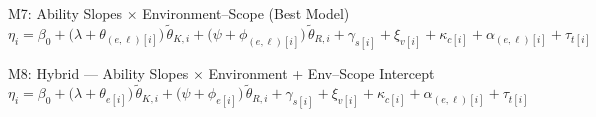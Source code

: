 \bigskip

\begin{hypobox}{M7: Ability Slopes $\times$ Environment--Scope (Best Model)}
\begin{equation*}
  \eta_i
    = \beta_0
    + \bigl(\lambda + \theta_{(e,\ell)[i]}\bigr)\,\tilde{\theta}_{K,i}
    + \bigl(\psi   + \phi_{(e,\ell)[i]}\bigr)\,\tilde{\theta}_{R,i}
    + \gamma_{s[i]}
    + \xi_{v[i]}
    + \kappa_{c[i]}
    + \alpha_{(e,\ell)[i]}
    + \tau_{t[i]}
\end{equation*}
\end{hypobox}

\bigskip

\begin{hypobox}{M8: Hybrid --- Ability Slopes $\times$ Environment + Env--Scope Intercept}
\begin{equation*}
  \eta_i
    = \beta_0
    + \bigl(\lambda + \theta_{e[i]}\bigr)\,\tilde{\theta}_{K,i}
    + \bigl(\psi   + \phi_{e[i]}\bigr)\,\tilde{\theta}_{R,i}
    + \gamma_{s[i]}
    + \xi_{v[i]}
    + \kappa_{c[i]}
    + \alpha_{(e,\ell)[i]}
    + \tau_{t[i]}
\end{equation*}
\end{hypobox}




